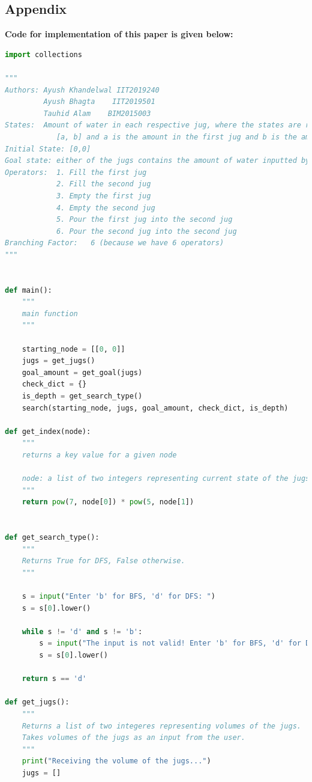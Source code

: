 \documentclass[conference]{IEEEtran}
\begin{document}
\begin{titlepage}
    \begin{center}
        \Huge
        \section*{Appendix}
        \end{center}
         \textbf{Code for implementation of this paper is given below:}
\begin{lstlisting}[language=Python,caption=Code for this paper]
import collections

"""
Authors: Ayush Khandelwal IIT2019240
         Ayush Bhagta    IIT2019501
         Tauhid Alam    BIM2015003
States:  Amount of water in each respective jug, where the states are represented by
            [a, b] and a is the amount in the first jug and b is the amount in the second jug
Initial State: [0,0]
Goal state: either of the jugs contains the amount of water inputted by the user
Operators:  1. Fill the first jug   
            2. Fill the second jug  
            3. Empty the first jug
            4. Empty the second jug
            5. Pour the first jug into the second jug
            6. Pour the second jug into the second jug
Branching Factor:   6 (because we have 6 operators)
"""


def main():
    """
    main function
    """

    starting_node = [[0, 0]]
    jugs = get_jugs()
    goal_amount = get_goal(jugs)
    check_dict = {}
    is_depth = get_search_type()
    search(starting_node, jugs, goal_amount, check_dict, is_depth)

def get_index(node):
    """
    returns a key value for a given node
    
    node: a list of two integers representing current state of the jugs 
    """
    return pow(7, node[0]) * pow(5, node[1])


def get_search_type():
    """
    Returns True for DFS, False otherwise.
    """
    
    s = input("Enter 'b' for BFS, 'd' for DFS: ")
    s = s[0].lower()
    
    while s != 'd' and s != 'b':
        s = input("The input is not valid! Enter 'b' for BFS, 'd' for DFS: ")
        s = s[0].lower()
        
    return s == 'd'

def get_jugs():
    """
    Returns a list of two integeres representing volumes of the jugs.
    Takes volumes of the jugs as an input from the user.
    """
    print("Receiving the volume of the jugs...")
    jugs = []
    

\end{lstlisting}
\end{titlepage}
\end{document}
